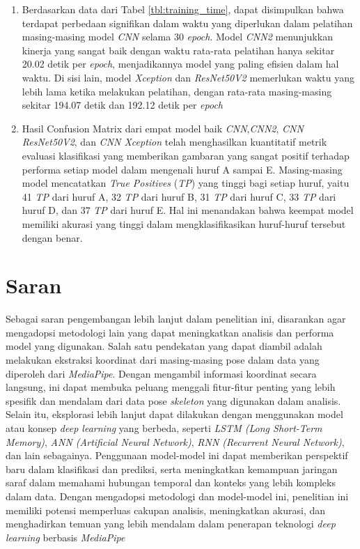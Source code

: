\begin{enumerate}[nolistsep]
\item Berdasarkan data dari Tabel \ref{tbl:training_time}, dapat disimpulkan bahwa terdapat perbedaan signifikan dalam waktu yang diperlukan dalam pelatihan masing-masing model \textit{CNN} selama 30 \textit{epoch}. Model \textit{CNN2} menunjukkan kinerja yang sangat baik dengan waktu rata-rata pelatihan hanya sekitar 20.02 detik per \textit{epoch}, menjadikannya model yang paling efisien dalam hal waktu. Di sisi lain, model \textit{Xception} dan \textit{ResNet50V2} memerlukan waktu yang lebih lama ketika melakukan pelatihan, dengan rata-rata masing-masing sekitar 194.07 detik dan 192.12 detik per \textit{epoch}
\item Hasil Confusion Matrix dari empat model baik \textit{CNN},\textit{CNN2}, \textit{CNN ResNet50V2}, dan \textit{CNN Xception} telah menghasilkan kuantitatif metrik evaluasi klasifikasi yang memberikan gambaran yang sangat positif terhadap performa setiap model dalam mengenali huruf A sampai E. Masing-masing model mencatatkan \textit{True Positives} (\textit{TP}) yang tinggi bagi setiap huruf, yaitu 41 \textit{TP} dari huruf A, 32 \textit{TP} dari huruf B, 31 \textit{TP} dari huruf C, 33 \textit{TP} dari huruf D, dan 37 \textit{TP} dari huruf E. Hal ini menandakan bahwa keempat model memiliki akurasi yang tinggi dalam mengklasifikasikan huruf-huruf tersebut dengan benar.
\end{enumerate}

\section{Saran}
Sebagai saran pengembangan lebih lanjut dalam penelitian ini, disarankan agar mengadopsi metodologi lain yang dapat meningkatkan analisis dan performa model yang digunakan. Salah satu pendekatan yang dapat diambil adalah melakukan ekstraksi koordinat dari masing-masing pose dalam data yang diperoleh dari \textit{MediaPipe}. Dengan mengambil informasi koordinat secara langsung, ini dapat membuka peluang menggali fitur-fitur penting yang lebih spesifik dan mendalam dari data pose \textit{skeleton} yang digunakan dalam analisis. Selain itu, eksplorasi lebih lanjut dapat dilakukan dengan menggunakan model atau konsep \textit{deep learning} yang berbeda, seperti \textit{LSTM (Long Short-Term Memory)}, \textit{ANN (Artificial Neural Network)},\textit{ RNN (Recurrent Neural Network)}, dan lain sebagainya. Penggunaan model-model ini dapat memberikan perspektif baru dalam klasifikasi dan prediksi, serta meningkatkan kemampuan jaringan saraf dalam memahami hubungan temporal dan konteks yang lebih kompleks dalam data. Dengan mengadopsi metodologi dan model-model ini, penelitian ini memiliki potensi memperluas cakupan analisis, meningkatkan akurasi, dan menghadirkan temuan yang lebih mendalam dalam penerapan teknologi \textit{deep learning} berbasis \textit{MediaPipe}

